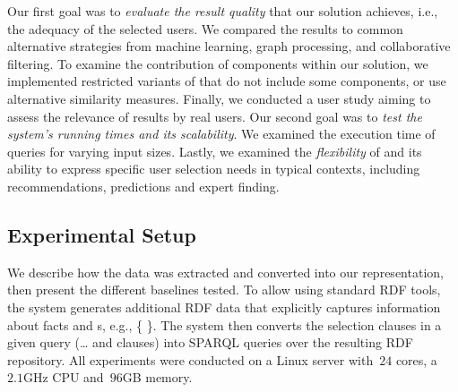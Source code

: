 Our first goal was to \emph{evaluate the result quality} that our solution achieves, i.e., the adequacy of the selected users. We compared the results to common alternative strategies from machine learning, graph processing, and collaborative filtering. To examine
the contribution of components within our solution,
we
implemented restricted variants of \qlang{} that do not include some
components, or use alternative similarity measures. 
Finally, we conducted a user study aiming to assess the relevance of results by real users.
Our second goal was to \emph{test the system's
running times and its scalability}. We examined the execution time of
\qlang{} queries for
varying input sizes.
Lastly, we examined the \emph{flexibility} of \qlang{} and its ability to express specific user selection needs in typical contexts, including recommendations, predictions and expert finding.







\subsection{Experimental Setup}
\label{experiments} We describe how the data was extracted and
converted into our representation, then present the different baselines tested. To allow using standard RDF tools, the system generates additional RDF data that explicitly captures information about facts and \fset{}s, e.g., \{  \}. The system then converts the selection clauses in a given \qlang{} query (\dots{} and  clauses) into SPARQL queries over the resulting RDF repository.
All experiments were conducted on a Linux server with~$24$ cores,
a~$2.1$GHz CPU and~$96$GB memory. 



